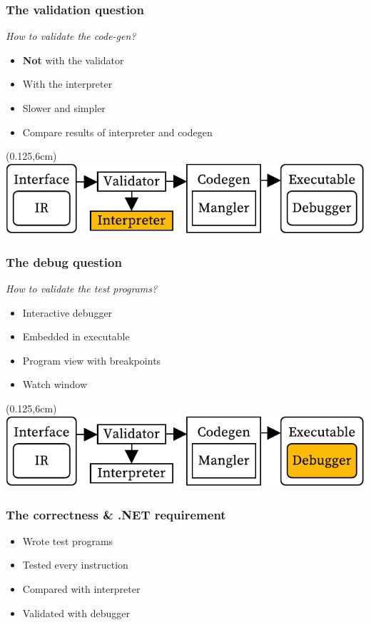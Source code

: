 \documentclass[xetex,serif,aspectratio=169]{beamer}
\begin{document}
\begin{frame}[t]
\end{frame}\begin{frame}[t]\frametitle{The validation question}
\textit{How to validate the code-gen?}
\begin{itemize}
    \item \textbf{Not} with the validator
    \item With the interpreter
    \item Slower and simpler
    \item Compare results of interpreter and codegen
\end{itemize}
\begin{textblock*}{0.75\paperwidth}(0.125\paperwidth,6cm)\includegraphics[width=0.75\paperwidth]{overview_validation}\end{textblock*}

\end{frame}\begin{frame}[t]\frametitle{The debug question}
\textit{How to validate the test programs?}
\begin{itemize}
    \item Interactive debugger
    \item Embedded in executable
    \item Program view with breakpoints
    \item Watch window
\end{itemize}
\begin{textblock*}{0.75\paperwidth}(0.125\paperwidth,6cm)\includegraphics[width=0.75\paperwidth]{overview_debugger}\end{textblock*}

\end{frame}\begin{frame}\frametitle{The correctness \& .NET requirement}
\begin{itemize}
    \item Wrote test programs
    \item Tested every instruction
    \item Compared with interpreter
    \item Validated with debugger
\end{itemize}


\end{frame}
\end{document}
